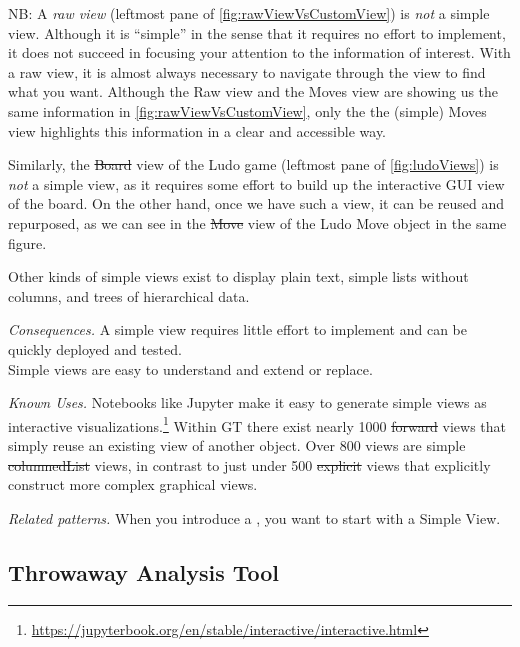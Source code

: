 \documentclass[sigconf,screen]{acmart}
\newcommand\eog[1]{\nbc{Edward}{#1}{purple}}
\newcommand\cp[1]{\nbe{Cesare}{#1}{olive}} %
\newcommand{\pattern}[2]{\needlines{10}
\subsection*{#1}\label{pat:#2}}
\newcommand{\patref}[1]{\emph{\nameref{pat:#1}}\xspace}
\newcommand{\patsec}[1]{\noindent\textit{#1.}\xspace}
\begin{document}

NB: A \emph{raw view} (leftmost pane of \autoref{fig:rawViewVsCustomView}) is \emph{not} a simple view.
Although it is ``simple'' in the sense that it requires no effort to implement, it does not succeed in focusing your attention to the information of interest.
With a raw view, it is almost always necessary to navigate through the view to find what you want.
Although the Raw view and the Moves view are showing us the same information in \autoref{fig:rawViewVsCustomView}, only the the (simple) Moves view highlights this information in a clear and accessible way.

Similarly, the \st{Board} view of the Ludo game (leftmost pane of \autoref{fig:ludoViews}) is \emph{not} a simple view, as it requires some effort to build up the interactive GUI view of the board.
On the other hand, once we have such a view, it can be reused and repurposed, as we can see in the \st{Move} view of the Ludo Move object in the same figure.

Other kinds of simple views exist to display plain text, simple lists without columns, and trees of hierarchical data.

\patsec{Consequences}
A simple view requires little effort to implement and can be quickly deployed and tested.\\
Simple views are easy to understand and extend or replace.

\patsec{Known Uses}
Notebooks like Jupyter make it easy to generate simple views as interactive visualizations.\footnote{\href{https://web.archive.org/web/20240430071604/https://jupyterbook.org/en/stable/interactive/interactive.html}{https://jupyterbook.org/en/stable/interactive/interactive.html}}
Within GT there exist nearly 1000 \st{forward} views that simply reuse an existing view of another object.
Over 800 views are simple \st{columnedList} views, in contrast to just under 500 \st{explicit} views that explicitly construct more complex graphical views.

\patsec{Related patterns}
When you introduce a \patref{CustomView}, you want to start with a Simple View.

\pattern{Throwaway Analysis Tool}{ThrowawayAnalysisTool}
\end{document}
